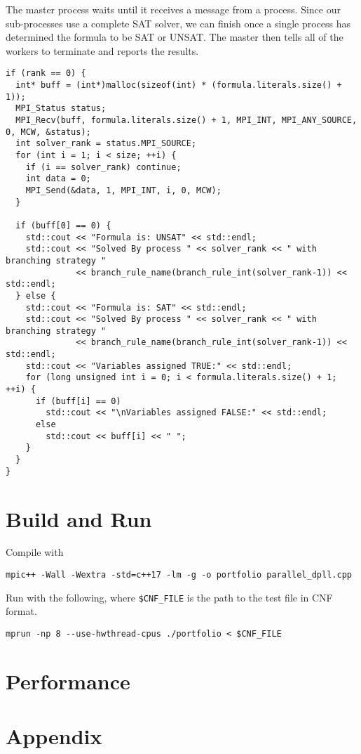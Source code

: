 \documentclass[10pt,AMS Euler]{article}
\begin{document}
The master process waits until it receives a message from
a process. Since our sub-processes use a complete SAT solver,
we can finish once a single process has determined the formula
to be SAT or UNSAT. The master then tells all of the workers
to terminate and reports the results.
\begin{verbatim}
if (rank == 0) {
  int* buff = (int*)malloc(sizeof(int) * (formula.literals.size() + 1));
  MPI_Status status;
  MPI_Recv(buff, formula.literals.size() + 1, MPI_INT, MPI_ANY_SOURCE, 0, MCW, &status);
  int solver_rank = status.MPI_SOURCE;
  for (int i = 1; i < size; ++i) {
    if (i == solver_rank) continue;
    int data = 0;
    MPI_Send(&data, 1, MPI_INT, i, 0, MCW);
  }
  
  if (buff[0] == 0) {
    std::cout << "Formula is: UNSAT" << std::endl;
    std::cout << "Solved By process " << solver_rank << " with branching strategy "
              << branch_rule_name(branch_rule_int(solver_rank-1)) << std::endl;
  } else {
    std::cout << "Formula is: SAT" << std::endl;
    std::cout << "Solved By process " << solver_rank << " with branching strategy "
              << branch_rule_name(branch_rule_int(solver_rank-1)) << std::endl;
    std::cout << "Variables assigned TRUE:" << std::endl;
    for (long unsigned int i = 0; i < formula.literals.size() + 1; ++i) {
      if (buff[i] == 0)
        std::cout << "\nVariables assigned FALSE:" << std::endl;
      else
        std::cout << buff[i] << " ";
    }
  }
}
\end{verbatim}
\section{Build and Run}
\label{sec:orgd6fbbd4}
Compile with
\begin{verbatim}
mpic++ -Wall -Wextra -std=c++17 -lm -g -o portfolio parallel_dpll.cpp
\end{verbatim}
Run with the following, where \texttt{\$CNF\_FILE} is the path to the test file in CNF format.
\begin{verbatim}
mprun -np 8 --use-hwthread-cpus ./portfolio < $CNF_FILE
\end{verbatim}
\section{Performance}
\label{sec:org1f1463e}

\section{Appendix}
\label{sec:org851c47d}
\end{document}
